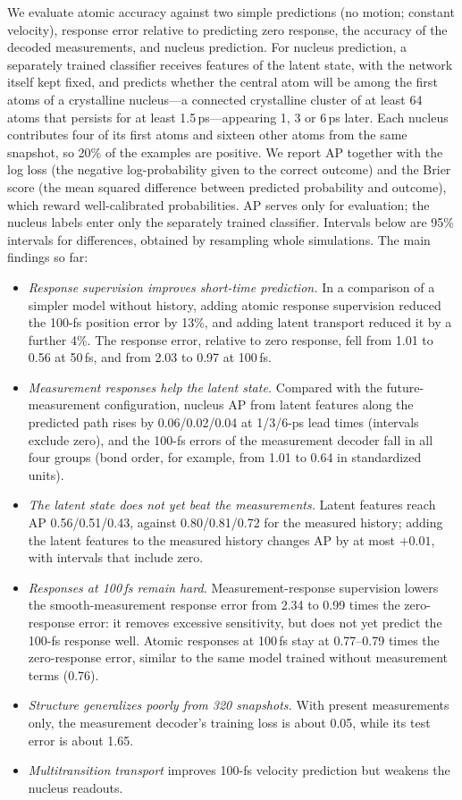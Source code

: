 \documentclass[11pt,a4paper]{article}
\numberwithin{equation}{section}
\begin{document}
We evaluate atomic accuracy against two simple predictions (no motion; constant
velocity), response error relative to predicting zero response, the accuracy of
the decoded measurements, and nucleus prediction. For nucleus prediction, a
separately trained classifier receives features of the latent state, with the
network itself kept fixed, and predicts whether the central atom will be among the
first atoms of a crystalline nucleus---a connected crystalline cluster of at least
64 atoms that persists for at least 1.5\,ps---appearing 1, 3 or 6\,ps later. Each
nucleus contributes four of its first atoms and sixteen other atoms from the same
snapshot, so 20\% of the examples are positive. We report AP together with the log
loss (the negative log-probability given to the correct outcome) and the Brier
score (the mean squared difference between predicted probability and outcome),
which reward well-calibrated probabilities. AP serves only for evaluation; the
nucleus labels enter only the separately trained classifier. Intervals below are
95\% intervals for differences, obtained by resampling whole simulations. The main
findings so far:
\begin{itemize}[leftmargin=1.5em]
\item \emph{Response supervision improves short-time prediction.} In a comparison of a
  simpler model without history, adding atomic response supervision reduced the 100-fs
  position error by 13\%, and adding latent transport reduced it by a further 4\%. The
  response error, relative to zero response, fell from 1.01 to 0.56 at 50\,fs, and from
  2.03 to 0.97 at 100\,fs.
\item \emph{Measurement responses help the latent state.} Compared with the
  future-measurement configuration, nucleus AP from latent features along the predicted
  path rises by 0.06/0.02/0.04 at 1/3/6-ps lead times (intervals exclude zero), and the
  100-fs errors of the measurement decoder fall in all four groups (bond order, for
  example, from 1.01 to 0.64 in standardized units).
\item \emph{The latent state does not yet beat the measurements.} Latent features reach
  AP 0.56/0.51/0.43, against 0.80/0.81/0.72 for the measured history; adding the latent
  features to the measured history changes AP by at most $+0.01$, with intervals that
  include zero.
\item \emph{Responses at 100\,fs remain hard.} Measurement-response supervision lowers
  the smooth-measurement response error from 2.34 to 0.99 times the zero-response
  error: it removes excessive sensitivity, but does not yet predict the 100-fs response
  well. Atomic responses at 100\,fs stay at 0.77--0.79 times the zero-response error,
  similar to the same model trained without measurement terms (0.76).
\item \emph{Structure generalizes poorly from 320 snapshots.} With present measurements
  only, the measurement decoder's training loss is about 0.05, while its test error is
  about 1.65.
\item \emph{Multitransition transport} improves 100-fs velocity prediction but weakens
  the nucleus readouts.
\end{itemize}
\end{document}
